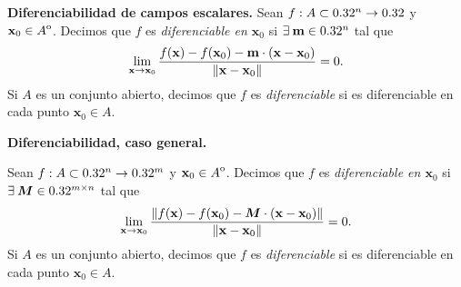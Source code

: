 \label{sec:diferenciabilidad}

\begin{definition}\textbf{Diferenciabilidad de campos escalares.} \label{def:dif_escalar}
\mbox{}
Sean $f: A \subset 0.32^n \to 0.32$ y $\mathbf{x}_0 \in {\kern0ptA}^{\mathrm{o}}$. Decimos que $f$ es \emph{diferenciable en $\mathbf{x}_0$} si $\exists\:\mathbf{m} \in 0.32^n$ tal que
\[
  \lim_{\mathbf{x} \to \mathbf{x}_0} \frac{f(\mathbf{x}) - f(\mathbf{x}_0) - \mathbf{m} \cdot (\mathbf{x} - \mathbf{x}_0)}{\norm{\mathbf{x} - \mathbf{x}_0}} = 0.
\]
Si $A$ es un conjunto abierto, decimos que $f$ es \emph{diferenciable} si es diferenciable en cada punto $\mathbf{x}_0 \in A$.
\end{definition}

\begin{definition}\textbf{Diferenciabilidad, caso general.} \label{def:dif_general}
\mbox{}

Sean $f: A \subset 0.32^n \to 0.32^m$ y $\mathbf{x}_0 \in {\kern0ptA}^{\mathrm{o}}$. Decimos que $f$ es \emph{diferenciable en $\mathbf{x}_0$} si $\exists\:\boldsymbol{M} \in 0.32^{m \times n}$ tal que
\[
  \lim_{\mathbf{x} \to \mathbf{x}_0} \frac{\norm{f(\mathbf{x}) - f(\mathbf{x}_0) - \boldsymbol{M} \cdot (\mathbf{x} - \mathbf{x}_0)}}{\norm{\mathbf{x} - \mathbf{x}_0}} = 0.
\]
Si $A$ es un conjunto abierto, decimos que $f$ es \emph{diferenciable} si es diferenciable en cada punto $\mathbf{x}_0 \in A$.
\end{definition}

